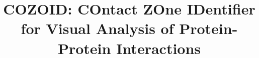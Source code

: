 \documentclass{bmcart}
\begin{document}
\begin{frontmatter}

\begin{fmbox}


\title{COZOID: COntact ZOne IDentifier for Visual Analysis of Protein-Protein Interactions}

\author[
   addressref={aff1},
   email={furmanova@mail.muni.cz}
]{ }
\author[
   addressref={aff2},     %
   email={jan.byska@gmail.com}   %
]{ }
\author[
   addressref={aff3},             %
   email={groeller@cg.tuwien.ac.at}   %
]{ }
\author[
   addressref={aff3},             %
   email={viola@cg.tuwien.ac.at}   %
]{ }
\author[
   addressref={aff4, aff5},             %
   email={jpalecek@sci.muni.cz}   %
]{ }
\author[
   addressref={aff1},             %
   corref={aff1},
   email={kozlikova@fi.muni.cz}   %
]{ }



\end{fmbox}
\end{frontmatter}
\end{document}
